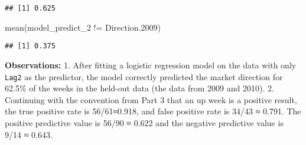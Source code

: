 \documentclass[
]{article}
\newenvironment{Shaded}{\begin{snugshade}}{\end{snugshade}}
\newcommand{\FloatTok}[1]{\textcolor[rgb]{0.00,0.00,0.81}{#1}}
\newcommand{\FunctionTok}[1]{\textcolor[rgb]{0.00,0.00,0.00}{#1}}
\newcommand{\NormalTok}[1]{#1}
\newcommand{\SpecialCharTok}[1]{\textcolor[rgb]{0.00,0.00,0.00}{#1}}
\begin{document}
\begin{verbatim}
## [1] 0.625
\end{verbatim}

\begin{Shaded}
\begin{Highlighting}[]
\FunctionTok{mean}\NormalTok{(model\_predict\_2 }\SpecialCharTok{!=}\NormalTok{ Direction}\FloatTok{.2009}\NormalTok{)}
\end{Highlighting}
\end{Shaded}

\begin{verbatim}
## [1] 0.375
\end{verbatim}

\textbf{Observations:} 1. After fitting a logistic regression model on
the data with only \texttt{Lag2} as the predictor, the model correctly
predicted the market direction for 62.5\% of the weeks in the held-out
data (the data from 2009 and 2010). 2. Continuing with the convention
from Part 3 that an up week is a positive result, the true positive rate
is 56/61≈0.918, and false positive rate is 34/43 ≈ 0.791. The positive
predictive value is 56/90 ≈ 0.622 and the negative predictive value is
9/14 ≈ 0.643.
\end{document}
